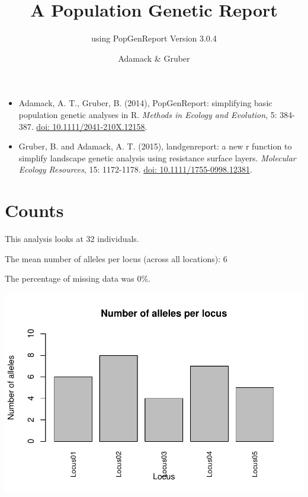\documentclass[a4paper]{scrartcl}\usepackage[]{graphicx}\usepackage[]{color}
\makeatletter
\def\maxwidth{ %
  \ifdim\Gin@nat@width>\linewidth
    \linewidth
  \else
    \Gin@nat@width
  \fi
}
\newenvironment{knitrout}{}{} %
\makeatother
\begin{document}
\title{A Population Genetic Report}


\subtitle {using PopGenReport Version  3.0.4 }

\author{Adamack \& Gruber}
\maketitle

\begin{itemize}
  \item Adamack, A. T., Gruber, B. (2014), PopGenReport: simplifying basic population genetic analyses in R. \emph{Methods in Ecology and Evolution}, 5: 384-387. \href{http://onlinelibrary.wiley.com/doi/10.1111/2041-210X.12158/full}{doi: 10.1111/2041-210X.12158}.
  \item Gruber, B. and Adamack, A. T. (2015), landgenreport: a new r function to simplify landscape genetic analysis using resistance surface layers. \emph{Molecular Ecology Resources}, 15: 1172-1178. \href{http://onlinelibrary.wiley.com/doi/10.1111/1755-0998.12381/full}{doi: 10.1111/1755-0998.12381}.
\end{itemize}


  

\tableofcontents
\newpage


\section{Counts}
This analysis looks at 32 individuals.

\noindent
\newline The mean number of alleles per locus (across all locations): 6


\noindent
\newline The percentage of missing data was 0\%.

\begin{knitrout}
\color{fgcolor}
\includegraphics[width=\maxwidth]{PopGenReport-n_alleles_per_locus-1} 

\end{knitrout}
\FloatBarrier
\end{document}
